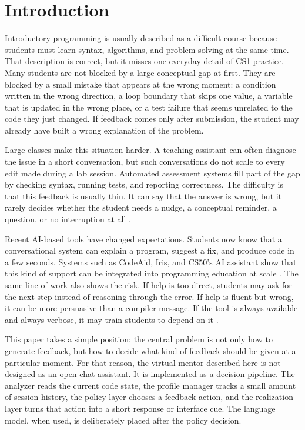 \documentclass[11pt]{article}
\begin{document}
\section{Introduction}

Introductory programming is usually described as a difficult course because students must learn syntax, algorithms, and problem solving at the same time. That description is correct, but it misses one everyday detail of CS1 practice. Many students are not blocked by a large conceptual gap at first. They are blocked by a small mistake that appears at the wrong moment: a condition written in the wrong direction, a loop boundary that skips one value, a variable that is updated in the wrong place, or a test failure that seems unrelated to the code they just changed. If feedback comes only after submission, the student may already have built a wrong explanation of the problem.

Large classes make this situation harder. A teaching assistant can often diagnose the issue in a short conversation, but such conversations do not scale to every edit made during a lab session. Automated assessment systems fill part of the gap by checking syntax, running tests, and reporting correctness. The difficulty is that this feedback is usually thin. It can say that the answer is wrong, but it rarely decides whether the student needs a nudge, a conceptual reminder, a question, or no interruption at all \cite{NavigatingAutomatedFeedback,AutomatedGradingandFeedbackToolsforProgrammingEducationSystematicReview}.

Recent AI-based tools have changed expectations. Students now know that a conversational system can explain a program, suggest a fix, and produce code in a few seconds. Systems such as CodeAid, Iris, and CS50's AI assistant show that this kind of support can be integrated into programming education at scale \cite{CodeAid,IRIS,ImprovingAIinCS50}. The same line of work also shows the risk. If help is too direct, students may ask for the next step instead of reasoning through the error. If help is fluent but wrong, it can be more persuasive than a compiler message. If the tool is always available and always verbose, it may train students to depend on it \cite{PatternsofLLMPoweredProgrammingAssistant,FeasibilityStudyofAugmentingTeachingAssistantswithAI,SystematicLiteratureReviewonLLM}.

This paper takes a simple position: the central problem is not only how to generate feedback, but how to decide what kind of feedback should be given at a particular moment. For that reason, the virtual mentor described here is not designed as an open chat assistant. It is implemented as a decision pipeline. The analyzer reads the current code state, the profile manager tracks a small amount of session history, the policy layer chooses a feedback action, and the realization layer turns that action into a short response or interface cue. The language model, when used, is deliberately placed after the policy decision.
\end{document}
